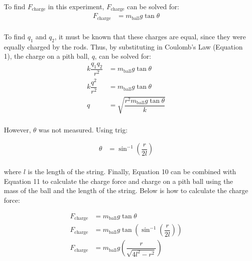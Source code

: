 \documentclass [12pt, letterpaper, twoside] {article}
\begin{document}
\noindent
To find \(F_{\text{charge}}\) in this experiment, \(F_{\text{charge}}\) can be solved for:
\begin{equation}
  \begin{split} 
    F_{\text{charge}} &= m_{\text{ball}}g\tan{\theta} \\
  \end{split}
\end{equation}

\noindent
To find \(q_{1}\) and \(q_{2}\), it must be known that these charges are equal, since they were equally charged by the rods. Thus, by substituting in Coulomb's Law (Equation 1), the charge on a pith ball, \(q\), can be solved for:
\begin{equation}
  \begin{split}
    k\dfrac{q_{1}q_{2}}{r^2} &= m_{\text{ball}}g\tan{\theta} \\
    k\dfrac{q^2}{r^2} &= m_{\text{ball}}g\tan{\theta} \\
    q &= \sqrt{\dfrac{r^{2}m_{\text{ball}}g\tan{\theta}}{k}} \\
  \end{split}
\end{equation}

\noindent
However, \(\theta\) was not measured. Using trig:

\begin{equation}
  \begin{split}
    \theta &= \sin^{-1}\left(\dfrac{r}{2l}\right) \\
  \end{split}
\end{equation}

\noindent
where \(l\) is the length of the string. Finally, Equation 10 can be combined with Equation 11 to calculate the charge force and charge on a pith ball using the mass of the ball and the length of the string. Below is how to calculate the charge force:

\begin{equation}
  \begin{split}
    F_{\text{charge}} &= m_{\text{ball}}g\tan{\theta} \\
    F_{\text{charge}} &= m_{\text{ball}}g\tan\left({\sin^{-1}\left(\dfrac{r}{2l}\right)}\right) \\
    F_{\text{charge}} &= m_{\text{ball}}g\left(\dfrac{r}{\sqrt{4l^2-r^2}}\right) \\
  \end{split}
\end{equation}
\end{document}
